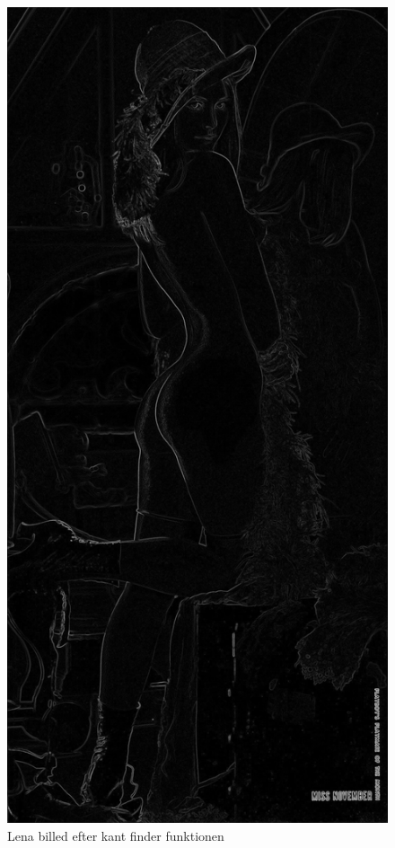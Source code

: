 \begin{figure}
\centering
\includegraphics[scale=0.25]{lena_edges}
\caption{Lena billed efter kant finder funktionen}
\end{figure}
